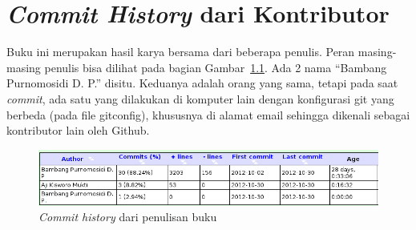 \chapter{\textit{Commit History} dari Kontributor}

Buku ini merupakan hasil karya bersama dari beberapa penulis. Peran masing-masing penulis bisa dilihat pada bagian Gambar~\ref{fig:commitHistory}. Ada 2 nama ``Bambang Purnomosidi D. P.'' disitu. Keduanya adalah orang yang sama, tetapi pada saat \textit{commit}, ada satu yang dilakukan di komputer lain dengan konfigurasi git yang berbeda (pada file gitconfig), khususnya di alamat email sehingga dikenali sebagai kontributor lain oleh Github.

  \begin{figure}
    \begin{center}
      \includegraphics[scale=0.5]{images/appendixCommitHistory.png}
    \end{center}
    \caption{\textit{Commit history} dari penulisan buku}
    \label{fig:commitHistory}
  \end{figure}



